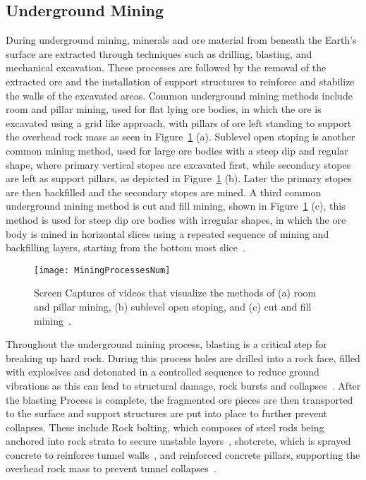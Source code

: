 \subsection{Underground Mining}
During underground mining, minerals and ore material from beneath the Earth’s surface are extracted through techniques such as drilling, blasting, and mechanical excavation.  These processes are followed by the removal of the extracted ore and the installation of support structures to reinforce and stabilize the walls of the excavated areas. Common underground mining methods include room and pillar mining, used for flat lying ore bodies, in which the ore is excavated using a grid like approach, with pillars of ore left standing to support the overhead rock mass as seen in Figure~\ref{fig:MiningProcessesNum} (a). Sublevel open stoping is another common mining method, used for large ore bodies with a steep dip and regular shape, where primary vertical stopes are excavated first, while secondary stopes are left as support pillars, as depicted in Figure~\ref{fig:MiningProcessesNum} (b). Later the primary stopes are then backfilled and the secondary stopes are mined. A third common underground mining method is cut and fill mining, shown in Figure~\ref{fig:MiningProcessesNum} (c), this method is used for steep dip ore bodies with irregular shapes, in which the ore body is mined in horizontal slices using a repeated sequence of mining and backfilling layers, starting from the bottom most slice~\cite{Brady1985}.

\begin{figure}[!h]
    \centering
    \texttt{[image: MiningProcessesNum]}
    \caption[Visualization of Different Underground Mining Processes]{
    Screen Captures of videos that visualize the methods of (a) room and pillar mining, (b) sublevel open stoping, and (c) cut and fill mining~\cite{Epiroc2019a, Epiroc2019b, Epiroc2019c}.
    }
    \label{fig:MiningProcessesNum}
\end{figure}

Throughout the underground mining  process, blasting is a critical step for breaking up hard rock. During this process holes are drilled into a rock face, filled with explosives and detonated in a controlled sequence to reduce ground vibrations as this can lead to structural damage, rock bursts and collapses~\cite{Xu2019}. After the blasting Process is complete, the fragmented ore pieces are then transported to the surface and support structures are put into place to further prevent collapses. These include Rock bolting, which composes of steel rods being anchored into rock strata to secure unstable layers~\cite{Wang2016}, shotcrete, which is sprayed concrete to reinforce tunnel walls~\cite{Brady1985}, and reinforced concrete pillars, supporting the overhead rock mass to prevent tunnel collapses~\cite{Cao2021}.

